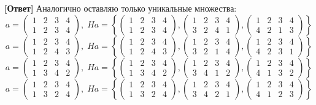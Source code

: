 \documentclass[a4paper,12pt]{article}
\begin{document}
\begin{itemize}
\textbf{[Ответ]} Аналогично оставляю только уникальные множества:
\[a = \begin{pmatrix} 1 & 2 & 3 & 4 \\ 1&2&3&4\end{pmatrix}, \; Ha = \left\{\begin{pmatrix} 1 & 2 & 3 & 4 \\ 1&2&3&4\end{pmatrix}, \begin{pmatrix} 1 & 2 & 3 & 4 \\ 3&2&4&1\end{pmatrix}, \begin{pmatrix} 1 & 2 & 3 & 4 \\ 4&2&1&3\end{pmatrix} \right\}\]
\[a = \begin{pmatrix} 1 & 2 & 3 & 4 \\ 1&2&4&3\end{pmatrix}, \; Ha = \left\{\begin{pmatrix} 1 & 2 & 3 & 4 \\ 1&2&4&3\end{pmatrix}, \begin{pmatrix} 1 & 2 & 3 & 4 \\ 3&2&1&4\end{pmatrix}, \begin{pmatrix} 1 & 2 & 3 & 4 \\ 4&2&3&1\end{pmatrix} \right\}\]
\[a = \begin{pmatrix} 1 & 2 & 3 & 4 \\ 1&3&4&2\end{pmatrix}, \; Ha = \left\{\begin{pmatrix} 1 & 2 & 3 & 4 \\ 1&3&4&2\end{pmatrix}, \begin{pmatrix} 1 & 2 & 3 & 4 \\ 3&4&1&2\end{pmatrix}, \begin{pmatrix} 1 & 2 & 3 & 4 \\ 4&1&3&2\end{pmatrix} \right\}\]
\[a = \begin{pmatrix} 1 & 2 & 3 & 4 \\ 1&3&2&4\end{pmatrix}, \; Ha = \left\{\begin{pmatrix} 1 & 2 & 3 & 4 \\ 1&3&2&4\end{pmatrix}, \begin{pmatrix} 1 & 2 & 3 & 4 \\ 3&4&2&1\end{pmatrix}, \begin{pmatrix} 1 & 2 & 3 & 4 \\ 4&1&2&3\end{pmatrix} \right\}\]

\end{itemize}
\end{document}
